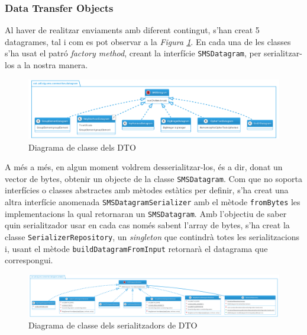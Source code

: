 \subsubsection{Data Transfer Objects}
Al haver de realitzar enviaments amb diferent contingut, s'han creat 5 datagrames, tal i com es pot observar a la \textit{Figura \ref{fig:dto}}. En cada una de les classes s'ha usat el patró \textit{factory method}, creant la interfície \texttt{SMSDatagram}, per serialitzar-los a la nostra manera.
\begin{figure}[H]
	\centering
	\includegraphics[width=16cm]{classes/dto.png}
	\caption{Diagrama de classe dels DTO}
	\label{fig:dto}
\end{figure}
A més a més, en algun moment voldrem desserialitzar-los, és a dir, donat un vector de bytes, obtenir un objecte de la classe \texttt{SMSDatagram}. Com que \texttt{\java } no soporta interfícies o classes abstractes amb mètodes estàtics per definir, s'ha creat una altra interfície anomenada \texttt{SMSDatagramSerializer} amb el mètode \texttt{fromBytes} les implementacions la qual retornaran un \texttt{SMSDatagram}. Amb l'objectiu de saber quin serialitzador usar en cada cas només sabent l'array de bytes, s'ha creat la classe \texttt{SerializerRepository}, un \textit{singleton} que contindrà totes les serialitzacions i, usant el mètode \texttt{buildDatagramFromInput} retornarà el datagrama que correspongui.
\begin{figure}[H]
	\centering
	\includegraphics[width=16cm]{classes/dtoser.png}
	\caption{Diagrama de classe dels serialitzadors de DTO}
	\label{fig:dtoser}
\end{figure}


